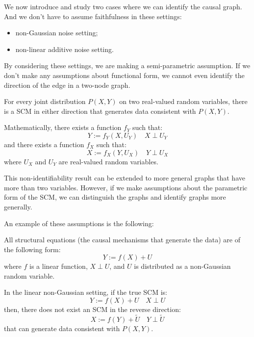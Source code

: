 We now introduce and study two cases where we can identify the causal graph. And
we don't have to assume faithfulness in these settings:
\begin{itemize}
    \item non-Gaussian noise setting;
    \item non-linear additive noise setting.
\end{itemize}
By considering these settings, we are making a semi-parametric assumption. If we
don't make any assumptions about functional form, we cannot even identify the
direction of the edge in a two-node graph.
\begin{definition}
    For every joint distribution $P(X, Y)$ on two real-valued random variables,
    there is a SCM in either direction that generates data consistent with $P(X, Y)$.

    Mathematically, there exists a function $f_Y$ such that:
    \begin{equation*}
        Y := f_Y(X, U_Y) \quad X \perp U_Y
    \end{equation*}
    and there exists a function $f_X$ such that:
    \begin{equation*}
        X := f_X(Y, U_X) \quad Y \perp U_X
    \end{equation*}
    where $U_X$ and $U_Y$ are real-valued random variables.
\end{definition}
This non-identifiability result can be extended to more general graphs that have
more than two variables. However, if we make assumptions about the parametric form
of the SCM, we can distinguish the graphs and identify graphs more generally.

An example of these assumptions is the following:
\begin{definition}
    All structural equations (the causal mechanisms that generate the data) are
    of the following form:
    \begin{equation}
        Y := f(X) + U
    \end{equation}
    where $f$ is a linear function, $X \perp U$, and $U$ is distributed as a 
    non-Gaussian random variable.
\end{definition}

\begin{definition}
    In the linear non-Gaussian setting, if the true SCM is:
    \begin{equation*}
        Y := f(X) + U \quad X \perp U
    \end{equation*}
    then, there does not exist an SCM in the reverse direction:
    \begin{equation*}
        X := f(Y) + \tilde{U} \quad Y \perp \tilde{U}
    \end{equation*}
    that can generate data consistent with $P(X, Y)$.
\end{definition}

